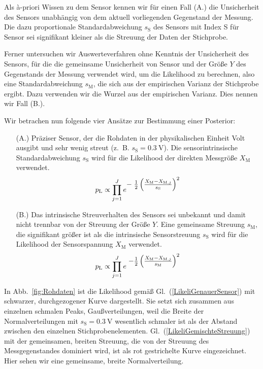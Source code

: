 Als {\`a}-priori Wissen zu dem Sensor kennen wir für einen Fall (A.) die Unsicherheit des
Sensors unabhängig von dem aktuell vorliegenden Gegenstand der Messung. Die dazu
proportionale Standardabweichung $s_\mathrm{S}$ des Sensors mit Index S für Sensor sei
signifikant kleiner als die Streuung der Daten der Stichprobe.

Ferner untersuchen wir Auswerteverfahren ohne Kenntnis der Unsicherheit des Sensors, für die
die gemeinsame Unsicherheit von Sensor und der Größe $Y$ des Gegenstands der Messung verwendet
wird, um die Likelihood zu berechnen, also eine Standardabweichung $s_\mathrm{M}$, die sich aus
der empirischen Varianz der Stichprobe ergibt. Dazu verwenden wir die Wurzel aus der empirischen
Varianz. Dies nennen wir Fall (B.).

Wir betrachen nun folgende vier Ansätze zur Bestimmung einer Posterior:

\begin{itemize}
	\item[(A.)] Präziser Sensor,
	der die Rohdaten in der physikalischen Einheit Volt ausgibt und sehr wenig streut
	(z.~B. $s_\mathrm{S} = 0.3~\mathrm{V}$). Die sensorintrinsische Standardabweichung
	$s_\mathrm{S}$ wird für die Likelihood der direkten Messgröße $X_\mathrm{M}$ verwendet.
\begin{equation}
p_\mathrm{L} \propto \prod\limits_{j=1}^J
e^{\textstyle -\;\frac{1}{2} \left(\frac{ X_\mathrm{M} - X_{\mathrm{M},j} }{s_\mathrm{S}} \right)^2}
\label{LikeliGenauerSensor}
\end{equation}
	\item[(B.)] Das intrinsische Streuverhalten des Sensors sei unbekannt und damit nicht
	trennbar von der Streuung der Größe $Y$. Eine gemeinsame Streuung $s_\mathrm{M}$, die signifikant
	größer ist als die intrinsische Sensorstreuung $s_\mathrm{S}$ wird für die Likelihood der
	Sensorspannung $X_\mathrm{M}$ verwendet.
\begin{equation}
p_\mathrm{L} \propto \prod\limits_{j=1}^J
e^{\textstyle \; -\frac{1}{2} \left(\frac{X_\mathrm{M} - X_{\mathrm{M},j}}{s_\mathrm{M}} \right)^2}
\label{LikeliGemischteStreuung}
\end{equation}
\end{itemize}
In Abb.~\ref{fig:Rohdaten} ist die Likelihood gemäß Gl.~(\ref{LikeliGenauerSensor})
mit schwarzer, durchgezogener Kurve dargestellt. Sie setzt sich zusammen aus einzelnen
schmalen Peaks, Gaußverteilungen, weil die Breite der Normalverteilungen mit
$s_\mathrm{S} = 0.3~\mathrm{V}$ wesentlich schmaler ist als der Abstand zwischen den
einzelnen Stichprobenelementen. Gl.~(\ref{LikeliGemischteStreuung}) mit der gemeinsamen, breiten
Streuung, die von der Streuung des Messgegenstandes dominiert wird, ist als rot gestrichelte
Kurve eingezeichnet. Hier sehen wir eine gemeinsame, breite Normalverteilung.

